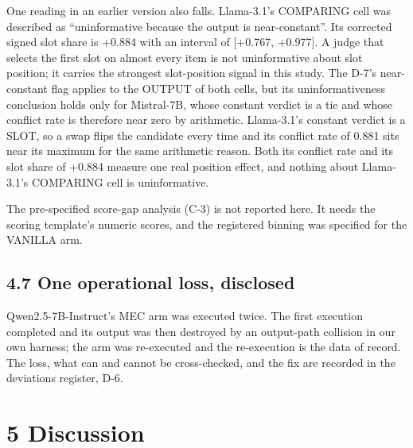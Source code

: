 One reading in an earlier version also falls. Llama-3.1's COMPARING cell was described as
``uninformative because the output is near-constant''. Its corrected signed slot share is +0.884 with
an interval of {[}+0.767, +0.977{]}. A judge that selects the first slot on almost every item is not
uninformative about slot position; it carries the strongest slot-position signal in this study. The
D-7's near-constant flag applies to the OUTPUT of both cells, but its uninformativeness
conclusion holds only for Mistral-7B, whose constant verdict is a tie and whose conflict rate is
therefore near zero by arithmetic. Llama-3.1's constant verdict is a SLOT, so a swap flips the
candidate every time and its conflict rate of 0.881 sits near its maximum for the same arithmetic
reason. Both its conflict rate and its slot share of +0.884 measure one real position effect, and
nothing about Llama-3.1's COMPARING cell is uninformative.

The pre-specified score-gap analysis (C-3) is not reported here. It needs the scoring template's
numeric scores, and the registered binning was specified for the VANILLA arm.

\subsection{4.7 One operational loss, disclosed}\label{one-operational-loss-disclosed}

Qwen2.5-7B-Instruct's MEC arm was executed twice. The first execution completed and its output was
then destroyed by an output-path collision in our own harness; the arm was re-executed and the
re-execution is the data of record. The loss, what can and cannot be cross-checked, and the fix are
recorded in the deviations register, D-6.

\section{5 Discussion}\label{discussion}

